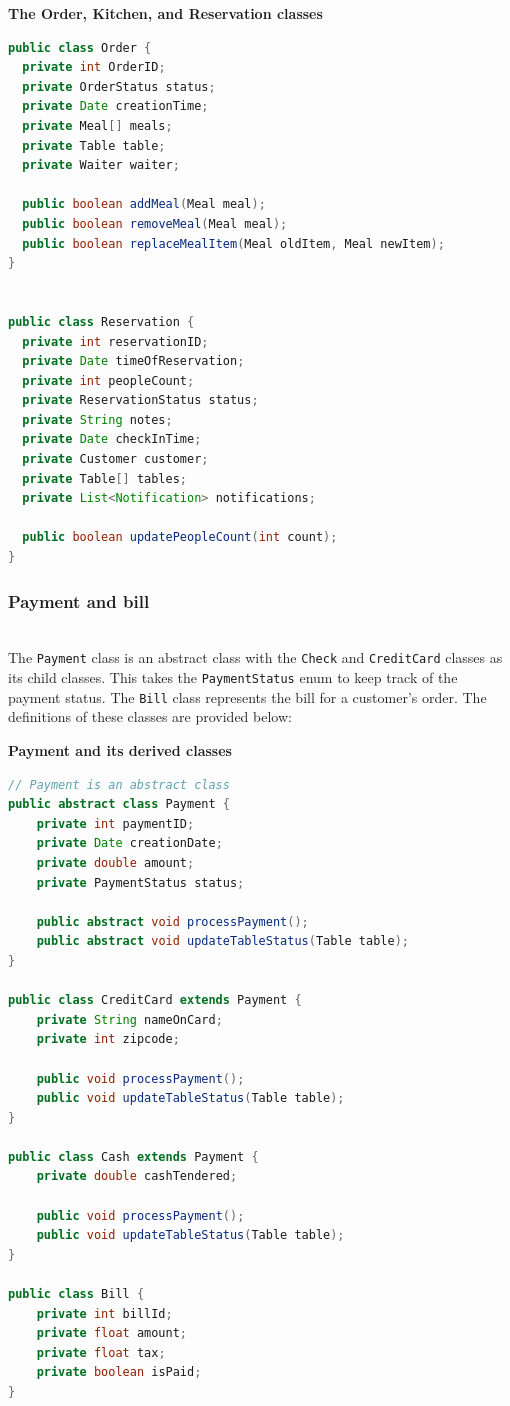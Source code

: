 \textbf{The Order, Kitchen, and Reservation classes}

\begin{lstlisting}[language=Java]
public class Order {
  private int OrderID;
  private OrderStatus status;
  private Date creationTime;
  private Meal[] meals;
  private Table table;
  private Waiter waiter;

  public boolean addMeal(Meal meal);
  public boolean removeMeal(Meal meal);
  public boolean replaceMealItem(Meal oldItem, Meal newItem);
}


public class Reservation {
  private int reservationID;
  private Date timeOfReservation;
  private int peopleCount;
  private ReservationStatus status;
  private String notes;
  private Date checkInTime;
  private Customer customer;
  private Table[] tables;
  private List<Notification> notifications;
  
  public boolean updatePeopleCount(int count);
}
\end{lstlisting}

\subsubsection{Payment and bill}\label{aZS5GpgQyNYsi_sDFRbGF}
\\
The \texttt{Payment} class is an abstract class with the \texttt{Check} and \texttt{CreditCard} classes as its child classes. This takes the \texttt{PaymentStatus} enum to keep track of the payment status. The
\texttt{Bill} class represents the bill for a customer's order. The definitions of these classes are provided below:

\textbf{Payment and its derived classes}

\begin{lstlisting}[language=Java]
// Payment is an abstract class
public abstract class Payment {
    private int paymentID;
    private Date creationDate;
    private double amount;      
    private PaymentStatus status;

    public abstract void processPayment();
    public abstract void updateTableStatus(Table table);
}

public class CreditCard extends Payment {
    private String nameOnCard;
    private int zipcode;

    public void processPayment();
    public void updateTableStatus(Table table);
}

public class Cash extends Payment {
    private double cashTendered;

    public void processPayment();
    public void updateTableStatus(Table table);
}

public class Bill {
    private int billId;
    private float amount;
    private float tax;
    private boolean isPaid;
}
\end{lstlisting}

